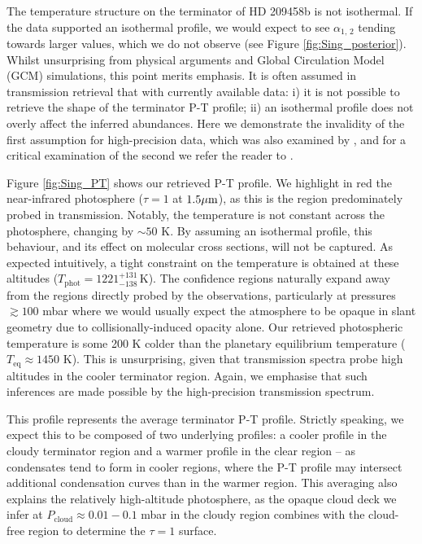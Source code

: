 \documentclass[fleqn,usenatbib]{mnras}
\begin{document}
The temperature structure on the terminator of HD 209458b is not isothermal. If the data supported an isothermal profile, we would expect to see $\alpha_{1, \,2}$ tending towards larger values, which we do not observe (see Figure \ref{fig:Sing_posterior}). Whilst unsurprising from physical arguments and Global Circulation Model (GCM) simulations, this point merits emphasis. It is often assumed in transmission retrieval that with currently available data: i) it is not possible to retrieve the shape of the terminator P-T profile; ii) an isothermal profile does not overly affect the inferred abundances. Here we demonstrate the invalidity of the first assumption for high-precision data, which was also examined by \citet{Barstow2013}, and for a critical examination of the second we refer the reader to \citet{Rocchetto2016}.

Figure \ref{fig:Sing_PT} shows our retrieved P-T profile. We highlight in red the near-infrared photosphere ($\tau = 1$ at $1.5 \hbox{$\mu$m}$), as this is the region predominately probed in transmission. Notably, the temperature is not constant across the photosphere, changing by $\sim 50$ K. By assuming an isothermal profile, this behaviour, and its effect on molecular cross sections, will not be captured. As expected intuitively, a tight constraint on the temperature is obtained at these altitudes ($T_{\mathrm{phot}} = 1221^{+131}_{-138} \,$K). The confidence regions naturally expand away from the regions directly probed by the observations, particularly at pressures $\gtrsim 100$ mbar where we would usually expect the atmosphere to be opaque in slant geometry due to collisionally-induced opacity alone. Our retrieved photospheric temperature is some 200 K colder than the planetary equilibrium temperature ($T_{\mathrm{eq}} \approx 1450$ K). This is unsurprising, given that transmission spectra probe high altitudes in the cooler terminator region. Again, we emphasise that such inferences are made possible by the high-precision transmission spectrum.

This profile represents the average terminator P-T profile. Strictly speaking, we expect this to be composed of two underlying profiles: a cooler profile in the cloudy terminator region and a warmer profile in the clear region -- as condensates tend to form in cooler regions, where the P-T profile may intersect additional condensation curves than in the warmer region. This averaging also explains the relatively high-altitude photosphere, as the opaque cloud deck we infer at $P_{\mathrm{cloud}} \approx 0.01-0.1$ mbar in the cloudy region combines with the cloud-free region to determine the $\tau = 1$ surface.
\end{document}
